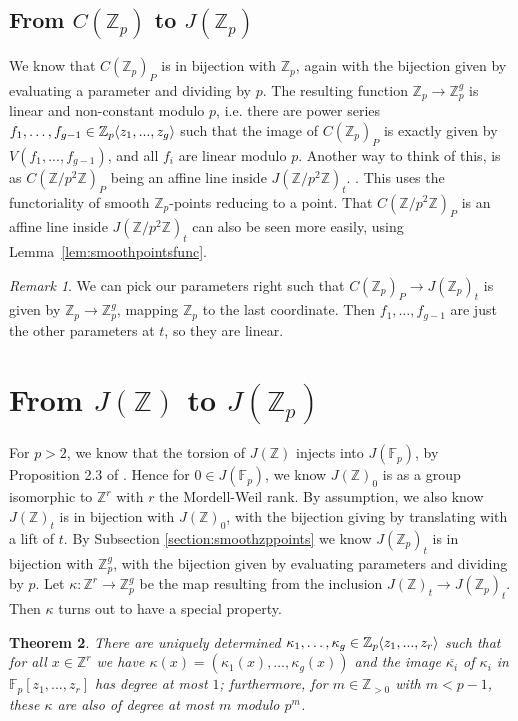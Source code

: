 \documentclass[12pt]{article}
\newcommand{\Z}{\mathbb{Z}}
\newcommand{\F}{\mathbb{F}}
\renewcommand{\angle}[1]{\hspace{-2pt}\left\langle #1 \right\rangle}
\theoremstyle{plain}
\newtheorem{thm}{Theorem}[section] %
\theoremstyle{definition}
\theoremstyle{remark}
\newtheorem{rem}[thm]{Remark} %
\begin{document}
\subsection{From \texorpdfstring{$C(\Z_p)$}{C(Z\_p)} to \texorpdfstring{$J(\Z_p)$}{J(Z\_p)}}
\label{subsection:czptojzp}
We know that $C(\Z_p)_P$ is in bijection with $\Z_p$, again with the bijection given by evaluating a parameter and dividing by $p$. The resulting function $\Z_p \to \Z_p^g$ is linear and non-constant modulo $p$, i.e. there are power series $f_1,\dots,f_{g-1} \in \Z_p\angle{z_1,...,z_g}$ such that the image of $C(\Z_p)_P$ is exactly given by $V(f_1,...,f_{g-1})$, and all $f_i$ are linear modulo $p$. Another way to think of this, is as $C(\Z/p^2\Z)_P$ being an affine line inside $J(\Z/p^2\Z)_t$.
. This uses the functoriality of smooth $\Z_p$-points reducing to a point. That $C(\Z/p^2\Z)_P$ is an affine line inside $J(\Z/p^2\Z)_t$ can also be seen more easily, using Lemma~\ref{lem:smoothpointsfunc}. 

\begin{rem}
\label{rem:fislinear}
We can pick our parameters right such that $C(\Z_p)_P \to J(\Z_p)_t$ is given by $\Z_p \to \Z_p^g$, mapping $\Z_p$ to the last coordinate. Then $f_1,\dots,f_{g-1}$ are just the other parameters at $t$, so they are linear. 
\end{rem}

\section{From \texorpdfstring{$J(\Z)$}{J(Z)} to \texorpdfstring{$J(\Z_p)$}{J(Z\_p)}}
\label{section:kappa}
For $p > 2$, we know that the torsion of $J(\Z)$ injects into $J(\F_p)$, by Proposition 2.3 of \cite{pierre2000}. Hence for $0 \in J(\F_p)$, we know $J(\Z)_0$ is as a group isomorphic to $\Z^r$ with $r$ the Mordell-Weil rank. By assumption, we also know $J(\Z)_t$ is in bijection with $J(\Z)_0$, with the bijection giving by translating with a lift of $t$. By Subsection \ref{section:smoothzppoints} we know $J(\Z_p)_t$ is in bijection with $\Z_p^{g}$, with the bijection given by evaluating parameters and dividing by $p$. Let $\kappa: \Z^r \to \Z_p^g$ be the map resulting from the inclusion $J(\Z)_t \to J(\Z_p)_t$. Then $\kappa$ turns out to have a special property.

\begin{thm}
\label{thm:kappanice}
There are uniquely determined $\kappa_1,\dots,\kappa_g \in \Z_p\angle{z_1,...,z_r}$ such that for all $x \in \Z^r$ we have $\kappa(x) = (\kappa_1(x),\dots,\kappa_g(x))$ and the image $\overline{\kappa_i}$ of $\kappa_i$ in $\F_p[z_1,...,z_r]$ has degree at most $1$; furthermore, for $m \in \Z_{>0}$ with $m<p-1$, these $\kappa$ are also of degree at most $m$ modulo $p^m$.
\end{thm}
\end{document}
